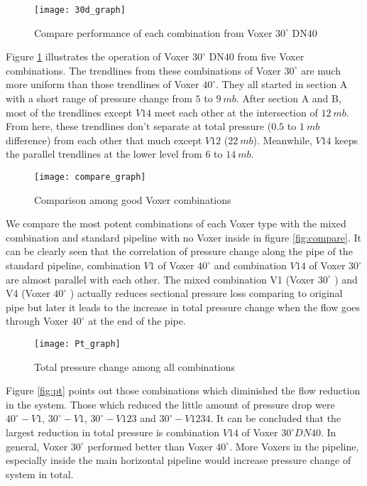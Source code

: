 \begin{figure}[t]
  \centering
  \texttt{[image: 30d\_graph]}
  \caption{Compare performance of each combination from Voxer $30^{\circ}$ DN40}
  \label{fig:30d}
\end{figure}

Figure \ref{fig:30d} illustrates the operation of Voxer $30^{\circ}$ DN40 from five Voxer combinations. The trendlines from these combinations of Voxer $30^{\circ}$ are much more uniform than those trendlines of Voxer $40^{\circ}$. They all started in section A with a short range of pressure change from $5$ to $9 \ mb$. After section A and B, most of the trendlines except $V14$ meet each other at the intersection of $12\ mb$. From here, these trendlines don't separate at total pressure ($0.5$ to $1 \ mb$ difference) from each other that much except $V12$ ($22\ mb$). Meanwhile, $V14$ keeps the parallel trendlines at the lower level from $6$ to $14\ mb$.
\begin{figure}[h!]
  \centering
  \texttt{[image: compare\_graph]}
  \caption{ Comparison among good Voxer combinations }
  \label{fig:compare}
\end{figure}

We compare the most potent combinations of each Voxer type with the mixed combination and standard pipeline with no Voxer inside in figure \vref{fig:compare}. It can be clearly seen that the correlation of pressure change along the pipe of the standard pipeline, combination $V1$ of Voxer $40^{\circ}$ and combination $V14$ of Voxer $30^{\circ}$ are almost parallel with each other. The mixed combination V1 (Voxer $30^{\circ}$ ) and V4 (Voxer $40^{\circ}$ ) actually reduces sectional pressure loss comparing to original pipe but later it leads to the increase in total pressure change when the flow goes through Voxer $40^{\circ}$  at the end of the pipe. 

\begin{figure}[h!]
  \centering
  \texttt{[image: Pt\_graph]}
  \caption{ Total pressure change among all combinations}
  \label{fig:pt}
\end{figure}

Figure \vref{fig:pt} points out those combinations which diminished the flow reduction in the system. Those which reduced the little amount of pressure drop were $40^{\circ}- V1$, $30^{\circ} - V1$, $30^{\circ} - V123$ and $30^{\circ} - V1234$. It can be concluded that the largest reduction in total pressure is combination $V14$ of Voxer $30^{\circ} DN40$. In general, Voxer $30^{\circ}$ performed better than Voxer $40^{\circ}$. More Voxers in the pipeline, especially inside the main horizontal pipeline would increase pressure change of system in total.  


